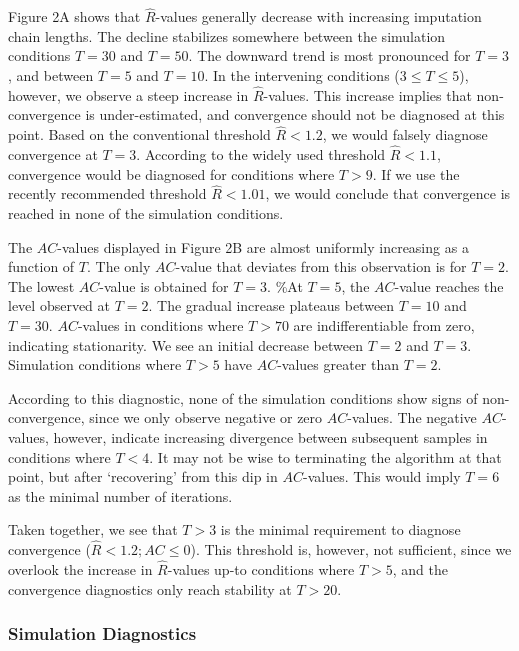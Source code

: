 \documentclass[
  Royal, times, sageapa]{sagej}
\begin{document}
Figure 2A shows that \(\widehat{R}\)-values generally decrease with
increasing imputation chain lengths. The decline stabilizes somewhere
between the simulation conditions \(T=30\) and \(T=50\). The downward
trend is most pronounced for \(T=3\), and between \(T = 5\) and
\(T = 10\). In the intervening conditions (\(3 \leq T \leq 5\)),
however, we observe a steep increase in \(\widehat{R}\)-values. This
increase implies that non-convergence is under-estimated, and
convergence should not be diagnosed at this point. Based on the
conventional threshold \(\widehat{R} < 1.2\), we would falsely diagnose
convergence at \(T=3\). According to the widely used threshold
\(\widehat{R} < 1.1\), convergence would be diagnosed for conditions
where \(T>9\). If we use the recently recommended threshold
\(\widehat{R} < 1.01\), we would conclude that convergence is reached in
none of the simulation conditions.

The \(AC\)-values displayed in Figure 2B are almost uniformly increasing
as a function of \(T\). The only \(AC\)-value that deviates from this
observation is for \(T=2\). The lowest \(AC\)-value is obtained for
\(T=3\). \%At \(T=5\), the \(AC\)-value reaches the level observed at
\(T=2\). The gradual increase plateaus between \(T=10\) and \(T=30\).
\(AC\)-values in conditions where \(T>70\) are indifferentiable from
zero, indicating stationarity. We see an initial decrease between
\(T=2\) and \(T=3\). Simulation conditions where \(T>5\) have
\(AC\)-values greater than \(T=2\).

According to this diagnostic, none of the simulation conditions show
signs of non-convergence, since we only observe negative or zero
\(AC\)-values. The negative \(AC\)-values, however, indicate increasing
divergence between subsequent samples in conditions where \(T<4\). It
may not be wise to terminating the algorithm at that point, but after
`recovering' from this dip in \(AC\)-values. This would imply \(T=6\) as
the minimal number of iterations.

Taken together, we see that \(T>3\) is the minimal requirement to
diagnose convergence (\(\widehat{R} < 1.2; AC \leq 0\)). This threshold
is, however, not sufficient, since we overlook the increase in
\(\widehat{R}\)-values up-to conditions where \(T>5\), and the
convergence diagnostics only reach stability at \(T>20\).

\hypertarget{simulation-diagnostics}{%
\subsubsection{Simulation Diagnostics}\label{simulation-diagnostics}}
\end{document}
